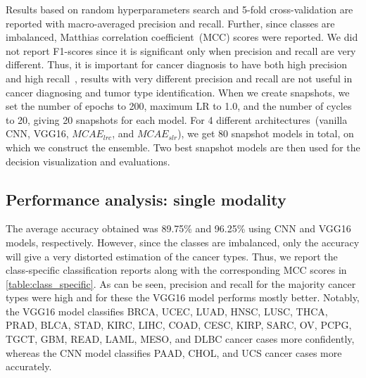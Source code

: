 \hspace*{3.5mm} Results based on random hyperparameters search and 5-fold cross-validation are reported with macro-averaged precision and recall. Further, since classes are imbalanced, Matthias correlation coefficient~(MCC) scores were reported. We did not report F1-scores since it is significant only when precision and recall are very different. Thus, it is important for cancer diagnosis to have both high precision and high recall~\cite{naulaerts2017precision}, results with very different precision and recall are not useful in cancer diagnosing and tumor type identification. 
When we create snapshots, we set the number of epochs to 200, maximum LR to 1.0, and the number of cycles to 20, giving 20 snapshots for each model. For 4 different architectures~(vanilla CNN, VGG16, $MCAE_{lrc}$, and $MCAE_{slr}$), we get 80 snapshot models in total, on which we construct the ensemble. Two best snapshot models are then used for the decision visualization and evaluations. 

\subsection{Performance analysis: single modality}
The average accuracy obtained was 89.75\% and 96.25\% using CNN and VGG16 models, respectively. However, since the classes are imbalanced, only the accuracy will give a very distorted estimation of the cancer types. Thus, we report the class-specific classification reports along with the corresponding MCC scores in \cref{table:class_specific}. As can be seen, precision and recall for the majority cancer types were high and for these the VGG16 model performs mostly better. Notably, the VGG16 model classifies BRCA, UCEC, LUAD, HNSC, LUSC, THCA, PRAD, BLCA, STAD, KIRC, LIHC, COAD, CESC, KIRP, SARC, OV, PCPG, TGCT, GBM, READ, LAML, MESO, and DLBC cancer cases more confidently, whereas the CNN model classifies PAAD, CHOL, and UCS cancer cases more accurately. 

